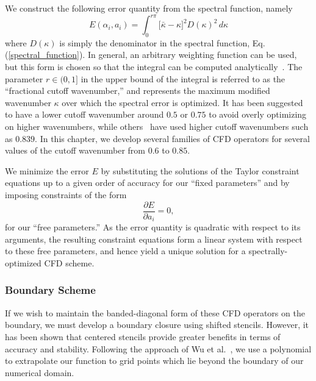 We construct the following error quantity from the spectral function, namely 
\begin{equation}
E(\alpha_i, a_i) = \int_{0}^{r \pi}{\bigl[ \bar{\kappa} - \kappa \bigr]^2 D(\kappa)^2 \, d\kappa}
\end{equation}
where $D(\kappa)$ is simply the denominator in the spectral function, Eq. (\ref{spectral_function}). In general, an arbitrary weighting function can be used, but this form is chosen so that the integral can be computed analytically~\cite{zhou_zhang,deshpande2019}. The parameter $r \in (0,1]$ in the upper bound of the integral is referred to as the ``fractional cutoff wavenumber,'' and represents the maximum modified wavenumber $\kappa$ over which the spectral error is optimized. It has been suggested~\cite{chen2023} to have a lower cutoff wavenumber around $0.5$ or $0.75$ to avoid overly optimizing on higher wavenumbers, while others~\cite{Kim2007} have used higher cutoff wavenumbers such as $0.839$. In this chapter, we develop several families of CFD operators for several values of the cutoff wavenumber from $0.6$ to $0.85$.

We minimize the error $E$ by substituting the solutions of the Taylor constraint equations up to a given order of accuracy for our ``fixed parameters'' and by imposing constraints of the form
\begin{equation}
\frac{\partial E}{\partial a_i} = 0,
\end{equation} 
for our ``free parameters.'' As the error quantity is quadratic with respect to its arguments, the resulting constraint equations form a linear system with respect to these free parameters, and hence yield a unique solution for a spectrally-optimized CFD scheme.

\subsubsection{Boundary Scheme}
If we wish to maintain the banded-diagonal form of these CFD operators on the boundary, we must develop a boundary closure using shifted stencils. However, it has been shown %
that centered stencils provide greater benefits in terms of accuracy and stability. Following the approach of Wu et al.~\cite{WuKim2024}, we use a polynomial to extrapolate our function to grid points which lie beyond the boundary of our numerical domain.


